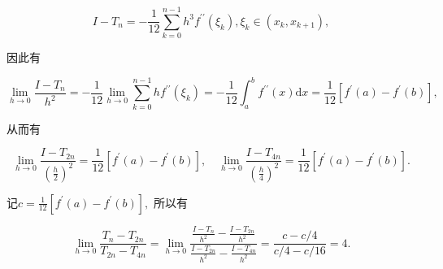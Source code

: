 \begin{tcolorbox}[enhanced,colback=10,colframe=9,breakable,coltitle=green!25!black,title=2024]
$$I {-} T_{n} = {-} \frac{1}{12}\mathop{{\sum}}\limits_{k = 0}^{n {-} 1}h^{3}f^{{\prime}{\prime}}\left( {\xi}_{k} \right),{\xi}_{k} {\in} \left( x_{k},x_{k + 1} \right),$$

因此有

$$\mathop{\lim}\limits_{h {\rightarrow} 0}\frac{I {-} T_{n}}{h^{2}} = {-} \frac{1}{12}\mathop{\lim}\limits_{h {\rightarrow} 0}\mathop{{\sum}}\limits_{k = 0}^{n {-} 1}hf^{{\prime}{\prime}}\left( {\xi}_{k} \right) = {-} \frac{1}{12}{{\int}}_{a}^{b}f^{{\prime}{\prime}}(x)\mathrm{d}x = \frac{1}{12}\left\lbrack f^{{\prime}}(a) {-} f^{{\prime}}(b) \right\rbrack,$$

从而有

$$\mathop{\lim}\limits_{h {\rightarrow} 0}\frac{I {-} T_{2n}}{{\left( \frac{h}{2} \right)}^{2}} = \frac{1}{12}\left\lbrack f^{{\prime}}(a) {-} f^{{\prime}}(b) \right\rbrack,\quad \mathop{\lim}\limits_{h {\rightarrow} 0}\frac{I {-} T_{4n}}{{\left( \frac{h}{4} \right)}^{2}} = \frac{1}{12}\left\lbrack f^{{\prime}}(a) {-} f^{{\prime}}(b) \right\rbrack.$$

记$c = \frac{1}{12}\left\lbrack f^{{\prime}}(a) {-} f^{{\prime}}(b) \right\rbrack,$ 所以有

$$\mathop{\lim}\limits_{h {\rightarrow} 0}\frac{T_{n} {-} T_{2n}}{T_{2n} {-} T_{4n}} = \mathop{\lim}\limits_{h {\rightarrow} 0}\frac{\frac{I {-} T_{n}}{h^{2}} {-} \frac{I {-} T_{2n}}{h^{2}}}{\frac{I {-} T_{2n}}{h^{2}} {-} \frac{I {-} T_{4n}}{h^{2}}}= \frac{c {-} c/4}{c/4 {-} c/16} = 4.$$
  \end{tcolorbox}

